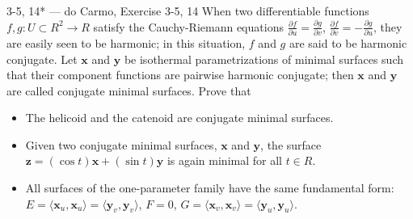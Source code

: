 \begin{exercise}{3-5, 14* — do Carmo, Exercise 3-5, 14}
When two differentiable functions $f, g \colon U \subset R^2 \to R$ satisfy the Cauchy-Riemann equations $\frac {\partial f}{\partial u} = \frac {\partial g}{\partial v}$, $\frac {\partial f}{\partial v} = - \frac {\partial g}{\partial u}$, they are easily seen to be harmonic; in this situation, $f$ and $g$ are said to be harmonic conjugate. Let $\mathbf{x}$ and $\mathbf{y}$ be isothermal parametrizations of minimal surfaces such that their component functions are pairwise harmonic conjugate; then $\mathbf{x}$ and $\mathbf{y}$ are called conjugate minimal surfaces. Prove that
\begin{itemize}
\item[a.] The helicoid and the catenoid are conjugate minimal surfaces.
\item[b.] Given two conjugate minimal surfaces, $\mathbf{x}$ and $\mathbf{y}$, the surface $\mathbf{z} = (\cos t) \mathbf{x} + (\sin t) \mathbf{y}$ is again minimal for all $t \in R$.
\item[c.] All surfaces of the one-parameter family have the same fundamental form: $E = \langle \mathbf{x}_u, \mathbf{x}_u \rangle = \langle \mathbf{y}_v, \mathbf{y}_v \rangle$, $F = 0$, $G = \langle \mathbf{x}_v, \mathbf{x}_v \rangle = \langle \mathbf{y}_u, \mathbf{y}_u \rangle$.
\end{itemize}
\end{exercise}
